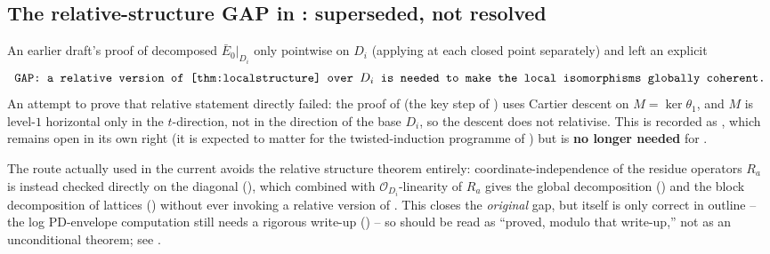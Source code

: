 \documentclass[11pt,reqno]{amsart}
\newcommand{\cO}{\mathcal{O}}
\theoremstyle{plain}
\theoremstyle{definition}
\theoremstyle{remark}
\numberwithin{equation}{section}
\begin{document}
\subsection{The relative-structure GAP in : superseded,
not resolved}
An earlier draft's proof of  decomposed
$\bar E_0|_{D_i}$ only pointwise on $D_i$ (applying
 at each closed point separately) and left an
explicit
\[
   \texttt{GAP: a relative version of \Cref{thm:localstructure} over }D_i
   \texttt{ is needed to make the local isomorphisms globally coherent.}
\]
An attempt to prove that relative statement directly failed: the proof of
 (the key step of ) uses Cartier
descent on $M=\ker\theta_1$, and $M$ is level-$1$ horizontal only in the
$t$-direction, not in the direction of the base $D_i$, so the descent does
not relativise.  This is recorded as , which remains
open in its own right (it is expected to matter for the twisted-induction
programme of ) but is \textbf{no longer needed}
for .

The route actually used in the current  avoids the
relative structure theorem entirely: coordinate-independence of the
residue operators $R_a$ is instead checked directly on the diagonal
(), which combined with $\cO_{D_i}$-linearity of
$R_a$ gives the global decomposition () and the
block decomposition of lattices () without ever
invoking a relative version of .  This closes
the \emph{original} gap, but  itself is only correct
in outline -- the log PD-envelope computation still needs a rigorous
write-up () -- so  should
be read as ``proved, modulo that write-up,'' not as an unconditional
theorem; see .
\end{document}
